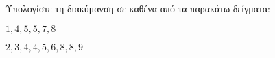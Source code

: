 Υπολογίστε τη διακύμανση σε καθένα από τα παρακάτω δείγματα:
\begin{Alist}
\item $ 1,4,5,5,7,8 $
\item $ 2,3,4,4,5,6,8,8,9 $
\end{Alist}
